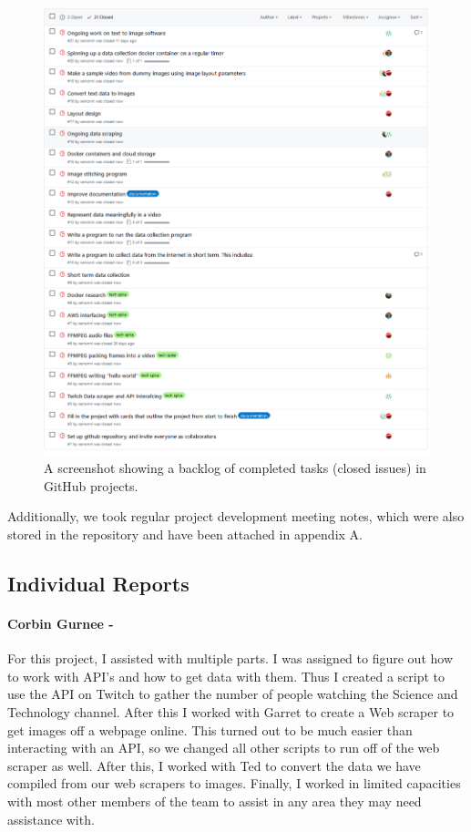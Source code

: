 \documentclass{article}
\begin{document}
  \begin{figure}[H]
    \centering
    \includegraphics[width=\linewidth]{img/task_backlog.png}
    \caption{A screenshot showing a backlog of completed tasks (closed issues) in GitHub projects.}
    \label{backlog}
  \end{figure}
  Additionally, we took regular project development meeting notes, which were also stored in the repository and have been attached in appendix A.
  \newpage
  \subsection{Individual Reports}
    \paragraph{Corbin Gurnee -}
    For this project, I assisted with multiple parts. I was assigned to figure out how to work with API’s and how to get data with them. Thus I created a script to use the API on Twitch to gather the number of people watching the Science and Technology channel. After this I worked with Garret to create a Web scraper to get images off a webpage online. This turned out to be much easier than interacting with an API, so we changed all other scripts to run off of the web scraper as well. After this, I worked with Ted to convert the data we have compiled from our web scrapers to images. Finally, I worked in limited capacities with most other members of the team to assist in any area they may need assistance with.
\end{document}
